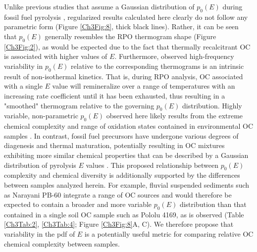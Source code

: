 Unlike previous studies that assume a Gaussian distribution of $p_{0}(E)$ during fossil fuel pyrolysis \citep{Lakshmanan:1994vs,Cai:2007hh,deCaprariis:2012jk}, regularized results calculated here clearly do not follow any parametric form (Figure \ref{Ch3Fig:8}, thick black lines). Rather, it can be seen that $p_{0}(E)$ generally resembles the RPO thermogram shape (Figure \ref{Ch3Fig:2}), as would be expected due to the fact that thermally recalcitrant OC is associated with higher values of $E$. Furthermore, observed high-frequency variability in $p_{0}(E)$ relative to the corresponding thermograms is an intrinsic result of non-isothermal kinetics. That is, during RPO analysis, OC associated with a single $E$ value will remineralize over a range of temperatures with an increasing rate coefficient until it has been exhausted, thus resulting in a "smoothed" thermogram relative to the governing $p_{0}(E)$ distribution. Highly variable, non-parametric $p_{0}(E)$ observed here likely results from the extreme chemical complexity and  range of oxidation states contained in environmental OC samples \citep[\textit{e.g.}][]{Kellerman:2015jn}. In contrast, fossil fuel precursors have undergone various degrees of diagenesis and thermal maturation, potentially resulting in OC mixtures exhibiting more similar chemical properties that can be described by a Gaussian distribution of pyrolysis $E$ values \citep{Braun:1987vf}. This proposed relationship between $p_{0}(E)$ complexity and chemical diversity is additionally supported by the differences between samples analyzed herein. For example, fluvial suspended sediments such as Narayani PB-60 integrate a range of OC sources \citep[\textit{e.g.} recently fixed biomass, pre-aged soils, and eroded rock-derived material;][]{Blair:2012du} and would therefore be expected to contain a broader and more variable $p_{0}(E)$ distribution than that contained in a single soil OC sample such as Pololu 4169, as is observed (Table \ref{Ch3Tab:2}, \ref{Ch3Tab:4}; Figure \ref{Ch3Fig:8}A, C). We therefore propose that variability in the pdf of $E$ is a potentially useful metric for comparing relative OC chemical complexity between samples.

